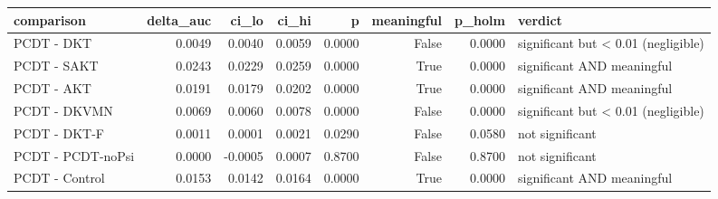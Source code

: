 \begin{tabular}{lrrrrrrl}
\toprule
comparison & delta\_auc & ci\_lo & ci\_hi & p & meaningful & p\_holm & verdict \\
\midrule
PCDT - DKT & 0.0049 & 0.0040 & 0.0059 & 0.0000 & False & 0.0000 & significant but < 0.01 (negligible) \\
PCDT - SAKT & 0.0243 & 0.0229 & 0.0259 & 0.0000 & True & 0.0000 & significant AND meaningful \\
PCDT - AKT & 0.0191 & 0.0179 & 0.0202 & 0.0000 & True & 0.0000 & significant AND meaningful \\
PCDT - DKVMN & 0.0069 & 0.0060 & 0.0078 & 0.0000 & False & 0.0000 & significant but < 0.01 (negligible) \\
PCDT - DKT-F & 0.0011 & 0.0001 & 0.0021 & 0.0290 & False & 0.0580 & not significant \\
PCDT - PCDT-noPsi & 0.0000 & -0.0005 & 0.0007 & 0.8700 & False & 0.8700 & not significant \\
PCDT - Control & 0.0153 & 0.0142 & 0.0164 & 0.0000 & True & 0.0000 & significant AND meaningful \\
\bottomrule
\end{tabular}
